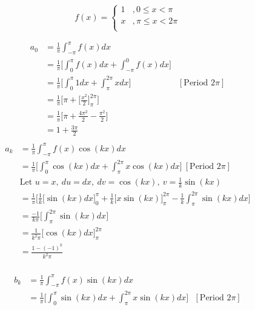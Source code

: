 \documentclass{article}
\begin{document}
\begin{enumerate}
        \[
        \displaystyle f(x) = \begin{cases}
                                    1 &,  0 \leq x < \pi \\
                                    x &,  \pi \leq x < 2\pi \\
                                \end{cases}
        \]
        \begin{multicols}{2}
        \begin{align*}
            a_0 &= \frac{1}{\pi} \int^{\pi}_{-\pi}f(x)dx\\
            &= \frac{1}{\pi} \Bigg[ \int^\pi_{0}f(x)dx + \int^{0}_{-\pi}f(x)dx \Bigg] \\
            &= \frac{1}{\pi} \Bigg[ \int^\pi_{0}1dx + \int^{2\pi}_{\pi}xdx \Bigg] &[\text{Period 2$\pi$}]\\
            &= \frac{1}{\pi} \Bigg[ \pi + \Big[ \frac{x^2}{2} \Big]^{2\pi}_{\pi} \Bigg] \\
            &= \frac{1}{\pi} \Bigg[ \pi +  \frac{4\pi^2}{2} - \frac{\pi^2}{2} \Bigg] \\
            &= 1 +  \frac{3\pi}{2}  \\
        \end{align*}
        \begin{align*}
            a_k &= \frac{1}{\pi} \int_{-\pi}^{\pi}f(x)\cos(kx)dx\\
            &= \frac{1}{\pi}\Bigg[ \int_{0}^{\pi}\cos(kx)dx+\int_{\pi}^{2\pi}x\cos(kx)dx \Bigg] \:[\text{Period 2$\pi$}]\\
            &\text{Let } u = x,\: du = dx,\: dv = \cos(kx),\: v = \frac{1}{k}\sin(kx) \\
            &= \frac{1}{\pi}\Bigg[ \frac{1}{k} \Big[\sin(kx)dx\Big]_{0}^{\pi}+\frac{1}{k}\Big[x\sin(kx) \Big]_{\pi}^{2\pi} - \frac{1}{k}\int_{\pi}^{2\pi} \sin(kx)dx\Bigg]\\
            &= \frac{-1}{k\pi}\Bigg[\int_{\pi}^{2\pi} \sin(kx)dx\Bigg]\\
            &= \frac{1}{k^2\pi}\Big[\cos(kx)dx\Big]_{\pi}^{2\pi}\\
            &= \frac{1 - (-1)^k}{k^2\pi}\\
        \end{align*}
        \end{multicols}
        \begin{align*}
            b_k &= \frac{1}{\pi} \int_{-\pi}^{\pi}f(x)\sin(kx) dx \\
            &= \frac{1}{\pi} \Bigg[\int_{0}^{\pi}\sin(kx)dx + \int_{\pi}^{2\pi}x\sin(kx)dx \Bigg]\:\:\:[\text{Period 2$\pi$}]\\

\end{align*}
\end{enumerate}
\end{document}
